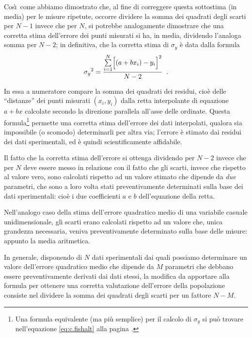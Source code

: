 Cos\`\i\ come abbiamo dimostrato che, al fine di correggere
questa sottostima (in media) per le misure ripetute, occorre
dividere la somma dei quadrati degli scarti per $N-1$ invece
che per $N$, si potrebbe analogamente dimostrare che una
corretta stima dell'errore dei punti misurati si ha, in
media, dividendo l'analoga somma per $N-2$; in definitiva,
che la corretta stima di $\sigma_y$ \`e data dalla formula
\begin{equation*}
  {\sigma_y}^2 = \frac{\sum\limits_{i=1}^N \Bigl[
    \left( a + b x_i \right) - y_i \Bigr]^2}{N - 2} \;\; .
\end{equation*}

In essa a numeratore compare la somma dei quadrati dei
residui, cio\`e delle ``distanze'' dei punti misurati $(x_i,
y_i)$ dalla retta interpolante di equazione $a+bx$ calcolate
secondo la direzione parallela all'asse delle ordinate.
Questa formula\/\footnote{Una formula equivalente (ma pi\`u
  semplice) per il calcolo di $\sigma_y$ si pu\`o trovare
  nell'equazione \eqref{eq:c.fishalt} alla pagina
  \pageref{eq:c.fishalt}.} permette una corretta stima
dell'errore dei dati interpolati, qualora sia impossibile (o
scomodo) determinarli per altra via; l'errore \`e stimato
dai residui dei dati sperimentali, ed \`e quindi
scientificamente affidabile.

Il fatto che la corretta stima dell'errore si ottenga
dividendo per $N-2$ invece che per $N$ deve essere messo in
relazione con il fatto che gli scarti, invece che rispetto
al valore vero, sono calcolati rispetto ad un valore stimato
che dipende da \emph{due} parametri, che sono a loro volta
stati preventivamente determinati sulla base dei dati
sperimentali: cio\`e i due coefficienti $a$ e $b$
dell'equazione della retta.

Nell'analogo caso della stima dell'errore quadratico medio
di una variabile casuale unidimensionale, gli scarti erano
calcolati rispetto ad un valore che, unica grandezza
necessaria, veniva preventivamente determinato sulla base
delle misure: appunto la media aritmetica.

In generale, disponendo di $N$ dati sperimentali dai quali
possiamo determinare un valore dell'errore quadratico medio
che dipende da $M$ parametri che debbano essere
preventivamente derivati dai dati stessi, la modifica da
apportare alla formula per ottenere una corretta valutazione
dell'errore della popolazione consiste nel dividere la somma
dei quadrati degli scarti per un fattore $N-M$.%


